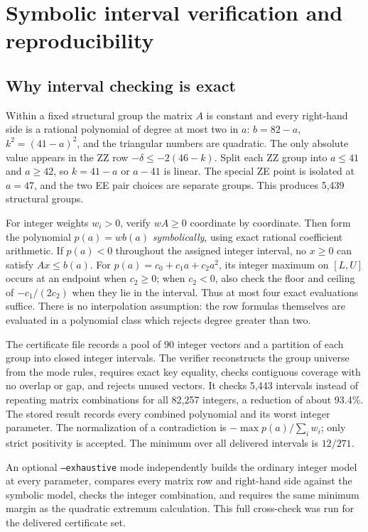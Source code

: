 \documentclass[11pt,a4paper]{article}
\begin{document}
\section{Symbolic interval verification and reproducibility}
\subsection{Why interval checking is exact}
Within a fixed structural group the matrix $A$ is constant and every
right-hand side is a rational polynomial of degree at most two in $a$:
$b=82-a$, $k^2=(41-a)^2$, and the triangular numbers are quadratic.
The only absolute value appears in the ZZ row $-\delta\le-2(46-k)$.
Split each ZZ group into $a\le41$ and $a\ge42$, so $k=41-a$ or $a-41$
is linear. The special ZE point is isolated at $a=47$, and the two EE
pair choices are separate groups. This produces 5,439 structural groups.

For integer weights $w_i>0$, verify $wA\ge0$ coordinate by coordinate.
Then form the polynomial $p(a)=wb(a)$ \emph{symbolically}, using exact
rational coefficient arithmetic. If $p(a)<0$ throughout the assigned
integer interval, no $x\ge0$ can satisfy $Ax\le b(a)$.
For $p(a)=c_0+c_1a+c_2a^2$, its integer maximum on $[L,U]$ occurs at
an endpoint when $c_2\ge0$; when $c_2<0$, also check the floor and ceiling
of $-c_1/(2c_2)$ when they lie in the interval.
Thus at most four exact evaluations suffice. There is no interpolation
assumption: the row formulas themselves are evaluated in a polynomial
class which rejects degree greater than two.

The certificate file records a pool of 90 integer vectors and a partition
of each group into closed integer intervals. The verifier reconstructs
the group universe from the mode rules, requires exact key equality,
checks contiguous coverage with no overlap or gap, and rejects unused
vectors. It checks 5,443 intervals instead of repeating matrix
combinations for all 82,257 integers, a reduction of about 93.4\%.
The stored result records every combined polynomial and its worst
integer parameter. The normalization of a contradiction is
$-\max p(a)/\sum_iw_i$; only strict positivity is accepted.
The minimum over all delivered intervals is $12/271$.

An optional \texttt{--exhaustive} mode independently builds the ordinary
integer model at every parameter, compares every matrix row and right-hand
side against the symbolic model, checks the integer combination, and
requires the same minimum margin as the quadratic extremum calculation.
This full cross-check was run for the delivered certificate set.
\end{document}
